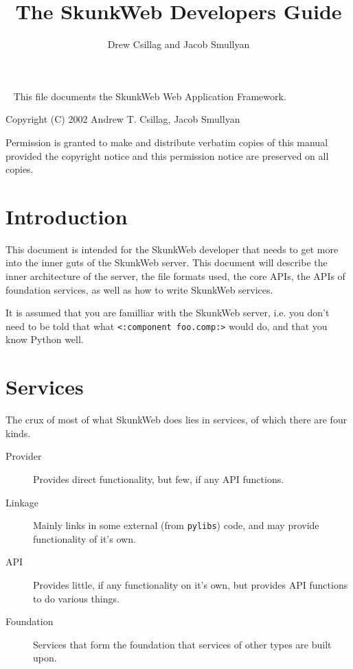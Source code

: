 \documentclass{manual}
\title{The SkunkWeb Developers Guide}
\author{Drew Csillag and Jacob Smullyan}
\begin{document}
\newcommand{\Location}{\texttt{Location}}
\newcommand{\PAR}{\texttt{par}}
\newcommand{\mskunkroot}[1]{\textit{SkunkRoot}\texttt{#1}}
\newcommand{\swpython}{\texttt{swpython}}
\newcommand{\connection}{\texttt{Connection}}
\newcommand{\NOTE}[1]{\textbf{\Large #1}}
\newcommand{\None}{\texttt{None}}
\newcommand{\nolocation}{[N]}
\newcommand{\service}[1]{\texttt{#1}\index{\texttt{#1}}}

\newcommand{\argdescitem}[1]{\hspace\labelsep
                                \normalfont\ttfamily #1\ }
\newenvironment{argdesc}{\begin{list}{}{
        \renewcommand{\makelabel}{\argdescitem}
}
}{\end{list}}

\maketitle
\ 
\vfill 
\noindent
This file documents the SkunkWeb Web Application Framework.

\noindent
Copyright (C) 2002 Andrew T. Csillag, Jacob Smullyan

\noindent
Permission is granted to make and distribute verbatim copies of
this manual provided the copyright notice and this permission notice
are preserved on all copies.


\tableofcontents

\chapter{Introduction}
This document is intended for the SkunkWeb developer that needs to get
more into the inner guts of the SkunkWeb server.  This document will
describe the inner architecture of the server, the file formats used,
the core APIs, the APIs of foundation services,
as well as how to
write SkunkWeb services.

It is assumed that you are familliar with the SkunkWeb server,
i.e. you don't need to be told that what \texttt{<:component
foo.comp:>} would do, and that you know Python well.

\chapter{Services}
The crux of most of what SkunkWeb does lies in services, of which
there are four kinds.
\begin{description}
\item[Provider] Provides direct functionality, but few, if any API functions.
\item[Linkage] Mainly links in some external (from \texttt{pylibs})
code, and may provide functionality of it's own.
\item[API] Provides little, if any functionality on it's own, but
provides API functions to do various things.  
\item[Foundation] Services that form the foundation that services of other types are built upon.
\end{description}
\end{document}
